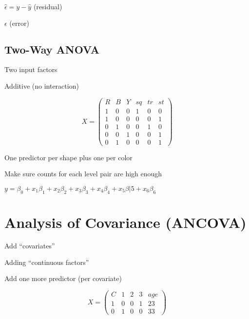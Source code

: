 \documentclass[twoside]{article}
\begin{document}
$\hat{\epsilon} = y - \hat{y}$ (residual)

$\epsilon$ (error)

\subsection{Two-Way ANOVA}

Two input factors

Additive (no interaction)

\[ X = \left( 
\begin{array}{cccccc}
R & B & Y & sq & tr & st \\
1 & 0 & 0 & 1 & 0 & 0 \\
1 & 0 & 0 & 0 & 0 & 1 \\
0 & 1 & 0 & 0 & 1 & 0 \\
0 & 0 & 1 & 0 & 0 & 1 \\
0 & 1 & 0 & 0 & 0 & 1 \end{array}
\right) \]

One predictor per shape plus one per color

Make sure counts for each level pair are high enough

$y = \beta_0 + x_1\beta_1 + x_2\beta_2 + x_3\beta_3 + x_4\beta_4 + x_5\beta|5 + x_6\beta_6$

\section{Analysis of Covariance (ANCOVA)}

Add ``covariates''

Adding ``continuous factors''

Add one more predictor (per covariate)

\[ X = \left( 
\begin{array}{ccccc}
C & 1 & 2 & 3 & age \\
1 & 0 & 0 & 1 & 23 \\
0 & 1 & 0 & 0 & 33 \end{array}
\right) \]
\end{document}
